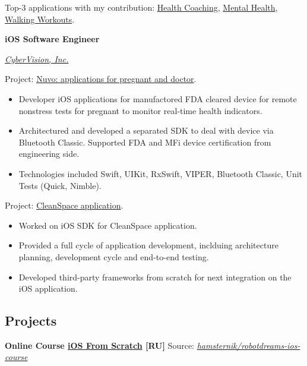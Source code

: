\documentclass[12pt]{article}
\newcommand{\SubSectionSpacing}{
    \vspace*{0.5em}
}
\newcommand{\Experience}[3]{%
    \noindent \textbf{#1}
    \hfill \text{#2} \par
    \noindent \textit{#3} \par
    \normalsize \normalfont \par
}
\newcommand{\Project}[3]{%
    \noindent \textbf{#1}
    \hfill \text{#2} \newline
    \small Source: \textit{#3}
    \vspace*{0.5em}
    \normalsize \normalfont \par
}
\begin{document}
\noindent Top-3 applications with my contribution: 
\href{https://apps.apple.com/us/app/betterme-weight-loss-workouts/id1264546236}{Health Coaching}, 
\href{https://apps.apple.com/us/app/betterme-calm-sleep-meditate/id1363010081}{Mental Health}, 
\href{https://apps.apple.com/us/app/betterme-walking-weightloss/id1434400695}{Walking Workouts}.

\SubSectionSpacing

\Experience
{iOS Software Engineer}
{Oct 2015 -- Sep 2018}
{\href{https://www.cybervisiontech.com}{CyberVision, Inc.}}

\noindent Project: \href{https://www.nuvocares.com/solutions}{Nuvo: applications for pregnant and doctor}.
\noindent
\begin{itemize}[label=-]
    \setlength\itemsep{0em}
    \item Developer iOS applications for manufactored FDA cleared device for remote nonstress tests for pregnant to monitor real-time health indicators.
    \item Architectured and developed a separated SDK to deal with device via Bluetooth Classic. 
    Supported FDA and MFi device certification from engineering side.
    \item Technologies included Swift, UIKit, RxSwift, VIPER, Bluetooth Classic, Unit Tests (Quick, Nimble).
\end{itemize}

\noindent Project: \href{https://www.sensynehealth.com/cleanspace}{CleanSpace application}.
\noindent
\begin{itemize}[label=-]
    \setlength\itemsep{0em}
    \item Worked on iOS SDK for CleanSpace application.
    \item Provided a full cycle of application development, inclduing architecture planning, development cycle and end-to-end testing.
    \item Developed third-party frameworks from scratch for next integration on the iOS application.
\end{itemize}


\subsection*{Projects}

\Project
{Online Course \textbf{\href{https://robotdreams.cc/course/ios-razrabotka-prilozheniy-s-0}{iOS From Scratch}} [RU]}
{Feb 2021 -- May 2021}
{\href{https://github.com/hamsternik/robotdreams-ios-course}{hamsternik/robotdreams-ios-course}}
\end{document}
